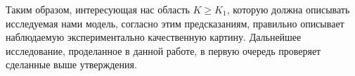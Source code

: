 Таким образом, интересующая нас область $K \ge K_1$, которую должна описывать исследуемая нами модель, согласно этим предсказаниям, правильно описывает наблюдаемую экспериментально качественную картину. Дальнейшее исследование, проделанное в данной работе, в первую очередь проверяет сделанные выше утверждения.